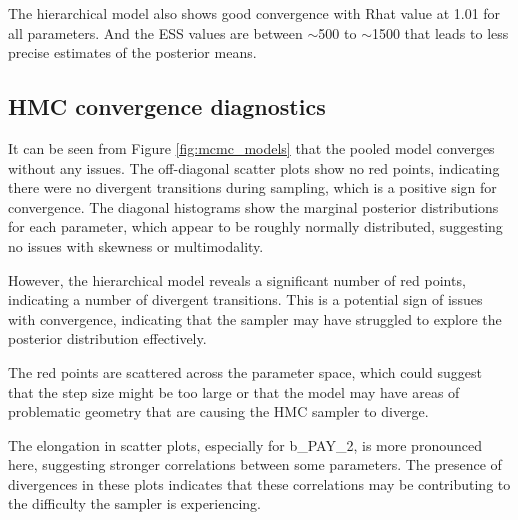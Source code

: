 \documentclass[a4paper]{artikel3}
\begin{document}
The hierarchical model also shows good convergence with Rhat value at 1.01 for all parameters. And the ESS values are between $\sim$500 to $\sim$1500 that leads to less precise estimates of the posterior means.

\subsection{HMC convergence diagnostics}

It can be seen from Figure \ref{fig:mcmc_models} that the pooled model converges without any issues. The off-diagonal scatter plots show no red points, indicating there were no divergent transitions during sampling, which is a positive sign for convergence. The diagonal histograms show the marginal posterior distributions for each parameter, which appear to be roughly normally distributed, suggesting no issues with skewness or multimodality.

However, the hierarchical model reveals a significant number of red points, indicating a number of divergent transitions. This is a potential sign of issues with convergence, indicating that the sampler may have struggled to explore the posterior distribution effectively.

The red points are scattered across the parameter space, which could suggest that the step size might be too large or that the model may have areas of problematic geometry that are causing the HMC sampler to diverge.

The elongation in scatter plots, especially for b\_PAY\_2, is more pronounced here, suggesting stronger correlations between some parameters. The presence of divergences in these plots indicates that these correlations may be contributing to the difficulty the sampler is experiencing.
\end{document}
